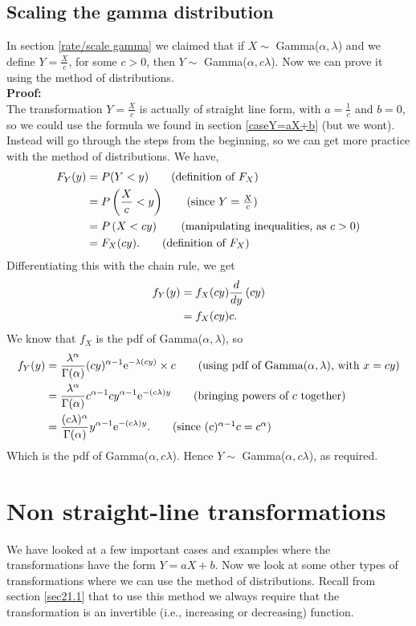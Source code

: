 \subsection{Scaling the gamma distribution} \label{ex21.1}
In section \ref{rate/scale gamma} we claimed that if $X \sim$ Gamma($\alpha,\lambda$) and we define $Y = \frac{X}{c}$, for some $c > 0$, then $Y \sim$ Gamma($\alpha,c\lambda$). Now we can prove it using the method of distributions. \\

\noindent \textbf{Proof:} \\
\noindent The transformation $Y = \frac{X}{c}$ is actually of straight line form, with $a = \frac{1}{c}$ and $b = 0$, so we could use the formula we found in section \ref{caseY=aX+b} (but we wont). Instead will go through the steps from the beginning, so we can get more practice with the method of distributions. We have,
\begin{align*}
F_Y(y) & = P(Y < y) \tag{definition of $F_X$} \\
	  & = P\brac{\frac{X}{c} < y} \tag{since $Y = \frac{X}{c}$} \\
	  & = P\brac{X < cy} \tag{manipulating inequalities, as $c > 0$} \\
	  & = F_X(cy).  \tag{definition of $F_X$}
\end{align*}
Differentiating this with the chain rule, we get
\begin{align*}
f_Y(y) & = f_X(cy) \frac{d}{dy}\left(cy\right)  \\
	 & = f_X(cy)c.
\end{align*}
We know that $f_X$ is the pdf of Gamma($\alpha,\lambda$), so 
\begin{align*}
f_Y(y) & = \frac{\lambda^\alpha}{\Gamma(\alpha)} (cy)^{\alpha - 1} \e^{-\lambda (cy)} \times c \tag{using pdf of Gamma($\alpha,\lambda$), with $x = cy$} \\
	 & = \frac{\lambda^\alpha}{\Gamma(\alpha)} c^{\alpha - 1}c y^{\alpha - 1} \e^{-(c \lambda) y} \tag{bringing powers of $c$ together} \\
	 & = \frac{(c\lambda)^\alpha}{\Gamma(\alpha)} y^{\alpha - 1} \e^{-(c \lambda) y}. \tag{since $(c)^{\alpha - 1}c = c^\alpha$}
\end{align*}
Which is the pdf of Gamma($\alpha,c\lambda$). Hence $Y \sim$ Gamma($\alpha,c\lambda$), as required.

\section{Non straight-line transformations}
We have looked at a few important cases and examples where the transformations have the form $Y = aX + b$. Now we look at some other types of transformations where we can use the method of distributions. Recall from section \ref{sec21.1} that to use this method we always require that the transformation is an invertible (i.e., increasing or decreasing) function. 

